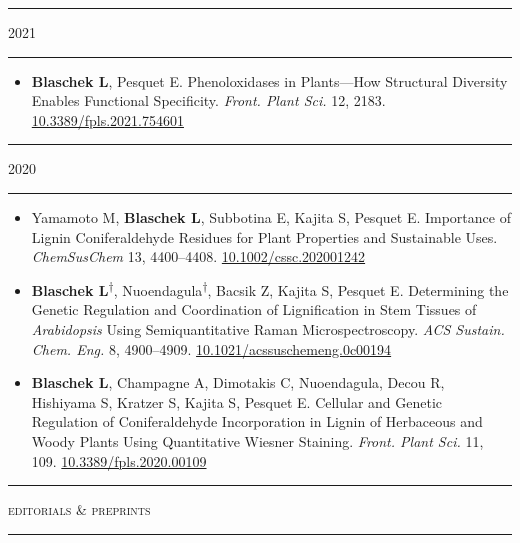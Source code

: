 \documentclass[11pt]{article}
\newcommand*{\xdash}[1][3em]{\rule[0.5ex]{#1}{0.55pt}}
\begin{document}
\hspace*{\fill} \xdash[6em] \large{\textsc{2021}} \xdash[6em] \hspace*{\fill} \normalsize

\vspace{-0.175cm}	
\begin{itemize}[label={},itemindent=-9pt,leftmargin=24pt]
	\itemsep-0.1cm
	\item \textbf{Blaschek L}, Pesquet E. Phenoloxidases in Plants—How Structural Diversity Enables Functional Specificity. \textit{Front. Plant Sci.} 12, 2183.
	\href{https://doi.org/10.3389/fpls.2021.754601}{10.3389/fpls.2021.754601}
\end{itemize}

\hspace*{\fill} \xdash[6em] \large{\textsc{2020}} \xdash[6em] \hspace*{\fill} \normalsize

\vspace{-0.175cm}	
\begin{itemize}[label={},itemindent=-9pt,leftmargin=24pt]
	\itemsep-0.1cm
	\item Yamamoto M, \textbf{Blaschek L}, Subbotina E, Kajita S, Pesquet E. Importance of Lignin Coniferaldehyde Residues for Plant Properties and Sustainable Uses. \textit{ChemSusChem} 13, 4400–4408.
	\href{https://doi.org/10.1002/cssc.202001242}{10.1002/cssc.202001242}
	\item \textbf{Blaschek L}\textsuperscript{$\dagger$}, Nuoendagula\textsuperscript{$\dagger$}, Bacsik Z, Kajita S, Pesquet E. Determining the Genetic Regulation and Coordination of Lignification in Stem Tissues of \textit{Arabidopsis} Using Semiquantitative Raman Microspectroscopy. \textit{ACS Sustain. Chem. Eng.} 8, 4900--4909. \href{https://dx.doi.org/10.1021/acssuschemeng.0c00194}{10.1021/acssuschemeng.0c00194}
	\item \textbf{Blaschek L}, Champagne A, Dimotakis C, Nuoendagula, Decou R, Hishiyama S, Kratzer S, Kajita S, Pesquet E. Cellular and Genetic Regulation of Coniferaldehyde Incorporation in Lignin of Herbaceous and Woody Plants Using Quantitative Wiesner Staining. \textit{Front. Plant Sci.} 11, 109. \href{https://doi.org/10.3389/fpls.2020.00109}{10.3389/fpls.2020.00109}
\end{itemize}

\hspace*{\fill} \xdash[6em] \large{\textsc{editorials \& preprints}} \xdash[6em] \hspace*{\fill}\normalsize
\end{document}
